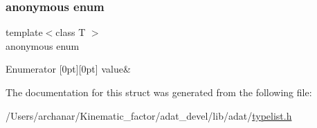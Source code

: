 \subsubsection{\texorpdfstring{anonymous enum}{anonymous enum}}
{\footnotesize\ttfamily template$<$class T $>$ \\
anonymous enum}

\begin{DoxyEnumFields}{Enumerator}
[0pt][0pt]{}\mbox{\label{structUtil_1_1TL_1_1IndexOf_3_01NullType_00_01T_01_4_aa7e6a49448f149e1e7dab1e44ccf5c12ab7ce1862f00c3baa377293bbd01efe32}} 
value&\\
\hline

\end{DoxyEnumFields}


The documentation for this struct was generated from the following file\+:\begin{DoxyCompactItemize}
\item 
/\+Users/archanar/\+Kinematic\+\_\+factor/adat\+\_\+devel/lib/adat/\mbox{\hyperlink{lib_2adat_2typelist_8h}{typelist.\+h}}\end{DoxyCompactItemize}
